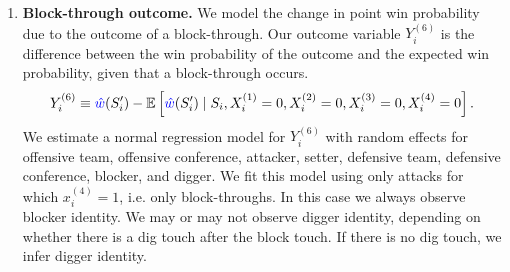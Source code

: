 \documentclass[USenglish]{article}
\theoremstyle{dgthm}
\theoremstyle{dgdef}
\begin{document}
\begin{enumerate}
        {\bf Block-return outcome.} We model the change in point win probability due to the outcome of a block-return. Our outcome variable $Y_i^{(5)}$ is the difference between the win probability of the outcome and the expected win probability, given that a block-return occurs.
        \begin{equation*}
            Y_i^{(5)} \equiv \textcolor{blue}{\hat w}(S'_i) - \mathbb{E}\left[\textcolor{blue}{\hat w}(S'_i) \mid S_i, X_i^{(1)} = 0, X_i^{(2)} = 0, X_i^{(3)} = 0, X_i^{(4)} = 1\right].
        \end{equation*}
        We estimate a normal regression model for $Y_i^{(5)}$ with random effects for offensive team, offensive conference, attacker, setter, defensive team, defensive conference, and blocker. We fit this model using only attacks for which $x_i^{(1)} = x_i^{(2)} = x_i^{(3)} = x_i^{(4)} = 0$, i.e. only block-returns. In this case we always observe blocker identity.
        \begin{equation}
        \label{eqn:attack-model-5}
            Y_i^{(5)} \sim \mbox{Normal}\left(
                \alpha + \gamma_{c_i} + \tau_{t_i} + \theta_{a_i} + \psi_{s_i} + \tilde\gamma_{\tilde c_i} + \tilde\tau_{\tilde t_i} + \beta_{b_i},\,
                \sigma^2_\epsilon
            \right).
        \end{equation}
    \item
        {\bf Block-through outcome.} We model the change in point win probability due to the outcome of a block-through. Our outcome variable $Y_i^{(6)}$ is the difference between the win probability of the outcome and the expected win probability, given that a block-through occurs.
        \begin{equation*}
            Y_i^{(6)} \equiv \textcolor{blue}{\hat w}(S'_i) - \mathbb{E}\left[\textcolor{blue}{\hat w}(S'_i) \mid S_i, X_i^{(1)} = 0, X_i^{(2)} = 0, X_i^{(3)} = 0, X_i^{(4)} = 0\right].
        \end{equation*}
        We estimate a normal regression model for $Y_i^{(6)}$ with random effects for offensive team, offensive conference, attacker, setter, defensive team, defensive conference, blocker, and digger. We fit this model using only attacks for which $x_i^{(4)} = 1$, i.e. only block-throughs. In this case we always observe blocker identity. We may or may not observe digger identity, depending on whether there is a dig touch after the block touch. If there is no dig touch, we infer digger identity.
        \begin{equation}
        \label{eqn:attack-model-6}

\end{equation}
\end{enumerate}
\end{document}
